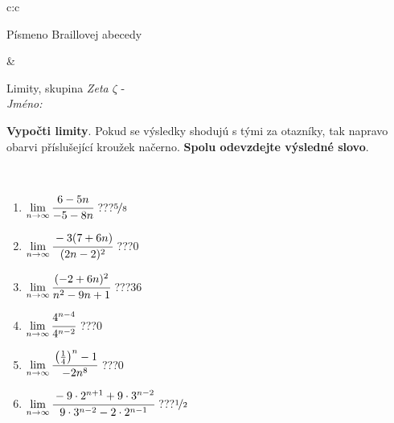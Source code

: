 \documentclass[10pt]{report}
\begin{document}
\begin{tabular}{c:c}
\begin{minipage}[c][104.5mm][t]{0.5\linewidth}
\begin{center}
\begin{minipage}{0.20\linewidth}
\begin{center}
{\small Písmeno Braillovej abecedy}
\end{center}
\end{minipage}
\end{center}
\end{minipage}
&
\begin{minipage}[c][104.5mm][t]{0.5\linewidth}
\begin{center}
\vspace{7mm}
{\huge Limity, skupina \textit{Zeta $\zeta$} -}\\[5mm]
\textit{Jméno:}\phantom{xxxxxxxxxxxxxxxxxxxxxxxxxxxxxxxxxxxxxxxxxxxxxxxxxxxxxxxxxxxxxxxxx}\\[5mm]
\begin{minipage}{0.95\linewidth}
\begin{center}
\textbf{Vypočti limity}. Pokud se výsledky shodujú s tými za otazníky, tak napravo\\obarvi příslušející kroužek načerno. \textbf{Spolu odevzdejte výsledné slovo}.
\end{center}
\end{minipage}
\\[1mm]
\begin{minipage}{0.79\linewidth}
\begin{center}
\begin{varwidth}{\linewidth}
\begin{enumerate}
\normalsize
\item $\lim\limits_{n\to\infty}\cfrac{6-5n}{-5-8n}$\quad \dotfill\; ???\;\dotfill \quad $\nicefrac{5}{8}$
\item $\lim\limits_{n\to\infty}\cfrac{-3(7+6n)}{(2n-2)^2}$\quad \dotfill\; ???\;\dotfill \quad $0$
\item $\lim\limits_{n\to\infty}\cfrac{(-2+6n)^2}{n^2-9n+1}$\quad \dotfill\; ???\;\dotfill \quad $36$
\item $\lim\limits_{n\to\infty}\cfrac{4^{n-4}}{4^{n-2}}$\quad \dotfill\; ???\;\dotfill \quad $0$
\item $\lim\limits_{n\to\infty}\cfrac{\left(\frac{1}{4}\right)^n -1}{-2n^{8}}$\quad \dotfill\; ???\;\dotfill \quad $0$
\item $\lim\limits_{n\to\infty}\cfrac{-9\cdot 2^{n+1}+9\cdot 3^{n-2}}{9\cdot 3^{n-2}-2\cdot 2^{n-1}}$\quad \dotfill\; ???\;\dotfill \quad $\nicefrac{1}{2}$
\end{enumerate}
\end{varwidth}
\end{center}
\end{minipage}
\begin{minipage}{0.20\linewidth}

\end{minipage}
\end{center}
\end{minipage}
\end{tabular}
\end{document}
